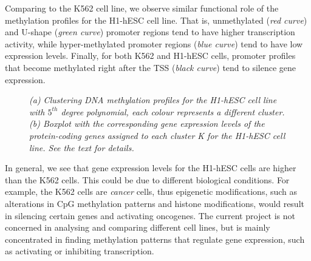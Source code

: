 Comparing to the K562 cell line, we observe similar functional role of the methylation profiles for the H1-hESC cell line. That is, unmethylated (\emph{red curve}) and U-shape (\emph{green curve}) promoter regions tend to have higher transcription activity, while hyper-methylated promoter regions (\emph{blue curve}) tend to have low expression levels. Finally, for both K562 and H1-hESC cells, promoter profiles that become methylated right after the TSS (\emph{black curve}) tend to silence gene expression. 
\begin{figure}[ht!]
     \begin{center}
    \end{center}
    \caption{\emph{(a) Clustering DNA methylation profiles for the H1-hESC cell line with $5^{th}$ degree polynomial, each colour represents a different cluster. (b) Boxplot with the corresponding gene expression levels of the protein-coding genes assigned to each cluster K for the H1-hESC cell line. See the text for details.}}
   \label{meth-H1-pic}
\end{figure}

In general, we see that gene expression levels for the H1-hESC cells are higher than the K562 cells. This could be due to different biological conditions. For example, the K562 cells are \emph{cancer} cells, thus epigenetic modifications, such as alterations in CpG methylation patterns and histone modifications, would result in silencing certain genes and activating oncogenes. The current project is not concerned in analysing and comparing different cell lines, but is mainly concentrated in finding methylation patterns that regulate gene expression, such as activating or inhibiting transcription. 